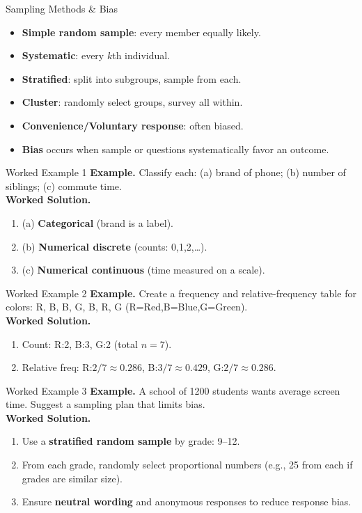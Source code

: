 \documentclass[aspectratio=169]{beamer}
\newcommand{\exampletitle}[1]{\vspace{0.25em}\textbf{Example.} #1\vspace{0.25em}}
\newcommand{\worked}{\textbf{Worked Solution.}}
\begin{document}
\begin{frame}{Sampling Methods \& Bias}
\begin{itemize}
  \item \textbf{Simple random sample}: every member equally likely.
  \item \textbf{Systematic}: every $k$th individual.
  \item \textbf{Stratified}: split into subgroups, sample from each.
  \item \textbf{Cluster}: randomly select groups, survey all within.
  \item \textbf{Convenience/Voluntary response}: often biased.
  \item \textbf{Bias} occurs when sample or questions systematically favor an outcome.
\end{itemize}
\end{frame}

\begin{frame}{Worked Example 1}
\exampletitle{Classify each: (a) brand of phone; (b) number of siblings; (c) commute time.}\\[0.25em]
\worked
\begin{enumerate}
  \item (a) \textbf{Categorical} (brand is a label).
  \item (b) \textbf{Numerical discrete} (counts: 0,1,2,\dots).
  \item (c) \textbf{Numerical continuous} (time measured on a scale).
\end{enumerate}
\end{frame}

\begin{frame}{Worked Example 2}
\exampletitle{Create a frequency and relative-frequency table for colors: R, B, B, G, B, R, G (R=Red,B=Blue,G=Green).}\\[0.25em]
\worked
\begin{enumerate}
  \item Count: R:2,\; B:3,\; G:2 (total $n=7$).
  \item Relative freq: R:$2/7\approx0.286$, B:$3/7\approx0.429$, G:$2/7\approx0.286$.
\end{enumerate}
\end{frame}

\begin{frame}{Worked Example 3}
\exampletitle{A school of 1200 students wants average screen time. Suggest a sampling plan that limits bias.}\\[0.25em]
\worked
\begin{enumerate}
  \item Use a \textbf{stratified random sample} by grade: 9--12.
  \item From each grade, randomly select proportional numbers (e.g., 25 from each if grades are similar size).
  \item Ensure \textbf{neutral wording} and anonymous responses to reduce response bias.
\end{enumerate}
\end{frame}
\end{document}
